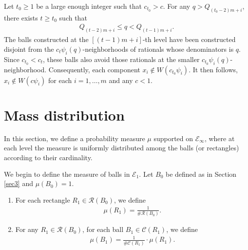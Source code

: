\documentclass[11pt]{amsart}
\numberwithin{equation}{section}
\newcommand{\0}{\mathbf{0}}
\theoremstyle{remark}
\newtheorem{rem}[lem]{\bf Remark}
\begin{document}
{Let $t_0\ge 1$ be a large enough integer such that $c_{t_0}>c$. For any $q>Q_{(t_0-2)m+i}$, there exists $t\ge t_0$ such that
\begin{align*}%
Q_{(t-2)m+i}\le q<Q_{(t-1)m+i}.
\end{align*}
The balls constructed at the $[(t-1)m+i]$-th level have been constructed disjoint from the $c_t\psi_i(q)$-neighborhoods of rationals whose denominators is $q$. Since $c_{t_0}<c_t$, these balls also avoid those rationals at the smaller $c_{t_0}\psi_i(q)$-neighborhood. Consequently, each component $x_i\notin W(c_{t_0}\psi_i)$.  It then follows, $x_i\notin W(c\psi_i)$ for each $i=1,\ldots,m$ and any $c<1$.
\section{Mass distribution}
In this section, we define a probability measure $\mu$ supported on $\mathcal{E}_{\infty}$, where at each level the measure is uniformly distributed among the balls (or rectangles) according to their cardinality.

We begin to define the measure of balls in $\mathcal{E}_1$. Let $B_0$ be defined as in Section \ref{sec3} and $\mu(B_0)=1$.
\begin{enumerate}
    \item For each rectangle $R_{1}\in\mathcal{R}(B_0)$, we define
    \begin{align*}
    \mu({R}_{1})=\frac{1}{\#\mathcal{R}(B_0)}.
    \end{align*}
    \item For any $R_1\in\mathcal{R}(B_0)$, for each ball $B_1\in\mathcal{C}(R_1)$, we define
    \begin{align*}
        \mu({B}_{1})=\frac{1}{\#{\mathcal{C}}({R}_1)}\cdot\mu(R_1).
    \end{align*}
\end{enumerate}

}
\end{document}
